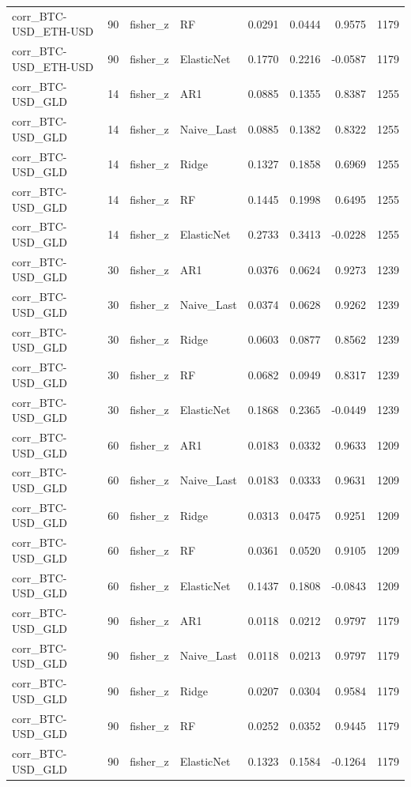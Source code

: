 \begin{table}[H]
\begin{tabular}{lllp{2.8cm}rrrr}
corr_BTC-USD_ETH-USD & 90 & fisher_z & RF & 0.0291 & 0.0444 & 0.9575 & 1179 \\
corr_BTC-USD_ETH-USD & 90 & fisher_z & ElasticNet & 0.1770 & 0.2216 & -0.0587 & 1179 \\
corr_BTC-USD_GLD & 14 & fisher_z & AR1 & 0.0885 & 0.1355 & 0.8387 & 1255 \\
corr_BTC-USD_GLD & 14 & fisher_z & Naive_Last & 0.0885 & 0.1382 & 0.8322 & 1255 \\
corr_BTC-USD_GLD & 14 & fisher_z & Ridge & 0.1327 & 0.1858 & 0.6969 & 1255 \\
corr_BTC-USD_GLD & 14 & fisher_z & RF & 0.1445 & 0.1998 & 0.6495 & 1255 \\
corr_BTC-USD_GLD & 14 & fisher_z & ElasticNet & 0.2733 & 0.3413 & -0.0228 & 1255 \\
corr_BTC-USD_GLD & 30 & fisher_z & AR1 & 0.0376 & 0.0624 & 0.9273 & 1239 \\
corr_BTC-USD_GLD & 30 & fisher_z & Naive_Last & 0.0374 & 0.0628 & 0.9262 & 1239 \\
corr_BTC-USD_GLD & 30 & fisher_z & Ridge & 0.0603 & 0.0877 & 0.8562 & 1239 \\
corr_BTC-USD_GLD & 30 & fisher_z & RF & 0.0682 & 0.0949 & 0.8317 & 1239 \\
corr_BTC-USD_GLD & 30 & fisher_z & ElasticNet & 0.1868 & 0.2365 & -0.0449 & 1239 \\
corr_BTC-USD_GLD & 60 & fisher_z & AR1 & 0.0183 & 0.0332 & 0.9633 & 1209 \\
corr_BTC-USD_GLD & 60 & fisher_z & Naive_Last & 0.0183 & 0.0333 & 0.9631 & 1209 \\
corr_BTC-USD_GLD & 60 & fisher_z & Ridge & 0.0313 & 0.0475 & 0.9251 & 1209 \\
corr_BTC-USD_GLD & 60 & fisher_z & RF & 0.0361 & 0.0520 & 0.9105 & 1209 \\
corr_BTC-USD_GLD & 60 & fisher_z & ElasticNet & 0.1437 & 0.1808 & -0.0843 & 1209 \\
corr_BTC-USD_GLD & 90 & fisher_z & AR1 & 0.0118 & 0.0212 & 0.9797 & 1179 \\
corr_BTC-USD_GLD & 90 & fisher_z & Naive_Last & 0.0118 & 0.0213 & 0.9797 & 1179 \\
corr_BTC-USD_GLD & 90 & fisher_z & Ridge & 0.0207 & 0.0304 & 0.9584 & 1179 \\
corr_BTC-USD_GLD & 90 & fisher_z & RF & 0.0252 & 0.0352 & 0.9445 & 1179 \\
corr_BTC-USD_GLD & 90 & fisher_z & ElasticNet & 0.1323 & 0.1584 & -0.1264 & 1179 \\
\bottomrule
\end{tabular}
\end{table}